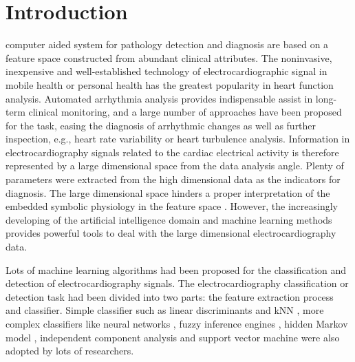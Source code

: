 \documentclass[journal]{IEEEtran}
\begin{document}
%
\IEEEpeerreviewmaketitle



\section{Introduction}
% 
% 
% 
% 
 computer aided system for pathology detection and diagnosis are based on a feature space constructed from abundant clinical attributes.
The noninvasive, inexpensive and well-established technology of electrocardiographic signal in mobile health or personal health has the greatest popularity in heart function analysis. 
Automated arrhythmia analysis provides indispensable assist in long-term clinical monitoring, and a large number of approaches have been proposed for the task, easing the diagnosis of arrhythmic changes as well as further inspection, e.g., heart rate variability or heart turbulence analysis.
Information in  electrocardiography signals related to the cardiac electrical activity is therefore represented by a large dimensional space from the data analysis angle.
Plenty of parameters were extracted from the high dimensional data as the indicators for diagnosis. 
The large dimensional space hinders a proper interpretation of the embedded symbolic physiology in the feature space \cite{delgado2009dimensionality}.
However, the increasingly developing of the artificial intelligence domain and machine learning methods provides powerful tools to deal with the large dimensional electrocardiography data.



Lots of machine learning algorithms had been proposed for the classification and detection of electrocardiography signals. 
The electrocardiography classification or detection task had been divided into two parts: the feature extraction process and classifier. 
Simple classifier such as linear discriminants \cite{chaza} and kNN \cite{melgan}, more complex classifiers like neural networks \cite{jiang, olmez, lin, osowski}, fuzzy inference engines \cite{osowski, kundu}, hidden Markov model \cite{andreao, coast}, independent component analysis \cite{zhu} and support vector machine  \cite{melgan, kampoura, khandoker} were also adopted by lots of researchers.  
\end{document}

